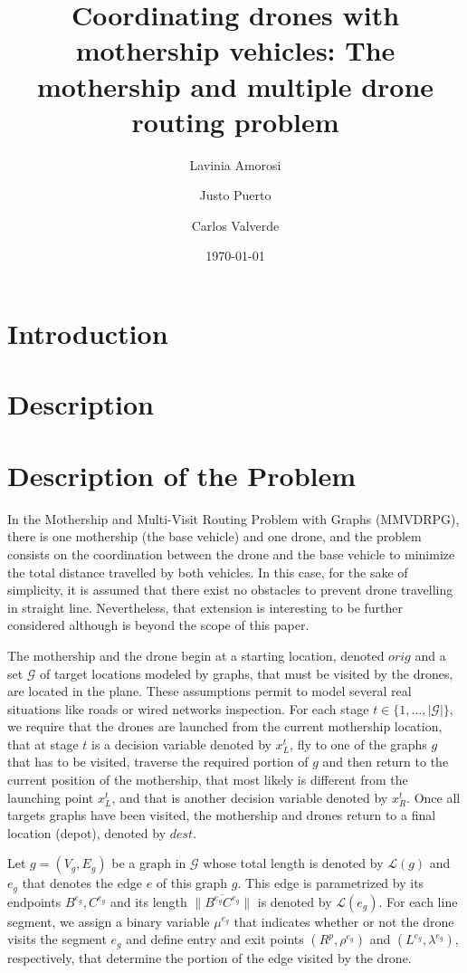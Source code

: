 \documentclass[10pt,a4paper]{article}
\title{Coordinating drones with mothership vehicles: The mothership and multiple drone routing problem}
\author{Lavinia Amorosi \and Justo Puerto \and Carlos Valverde}
\date{\today}
\newcommand{\LA}[1]{{\color{blue}#1}}
\begin{document}
\section{Introduction}

\section{Description}
\section{Description of the Problem}
In the Mothership and Multi-Visit Routing Problem with Graphs (MMVDRPG), there is one mothership (the base vehicle) and one drone, and the problem consists on the coordination between the drone and the base vehicle to minimize the total distance travelled by both vehicles. In this case, for the sake of simplicity, \LA{it is assumed} that there exist no obstacles to prevent drone travelling in straight line. Nevertheless, that extension is interesting to be further considered although is beyond the scope of this paper.

The mothership and the drone begin at a starting location, denoted $orig$ \LA{and a set $\mathcal G$ of target locations modeled by graphs, that must be visited by the drones, are located in the plane. These assumptions permit to model several real situations like roads or wired networks inspection.}
For each stage $t \in \{1, \ldots, |\mathcal G|\}$, we require that the drones are launched from the current mothership location, that at stage $t$ is a decision variable denoted by $x_L^t$, fly to one of the graphs $g$ that has to be visited, traverse the required portion of $g$ and then return to the current position of the mothership, that most likely is different from the launching point $x_L^t$, and that is another decision variable denoted by $x_R^t$. Once all targets graphs have been visited, the mothership and drones return to a final location (depot), denoted by $dest$.

Let $g = (V_g, E_g)$ be a graph in $\mathcal G$ whose total length is denoted by $\mathcal L(g)$ and $e_g$ that denotes the edge $e$ of this graph $g$. This edge is parametrized by its endpoints $B^{e_g}, C^{e_g}$ and its length $\|\overline{B^{e_g}C^{e_g}}\|$ is denoted by $\mathcal L(e_g)$. For each line segment, we assign a binary variable $\mu^{e_g}$ that indicates whether or not the drone visits the segment $e_g$ and define entry and exit points $(R^p, \rho^{e_g})$ and $(L^{e_g}, \lambda^{e_g})$, respectively, that determine the portion of the edge visited by the drone.
\end{document}
